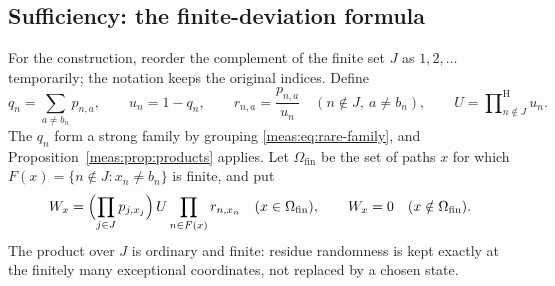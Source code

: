 \documentclass[11pt]{article}
\numberwithin{equation}{section}
\theoremstyle{definition}
\theoremstyle{remark}
\newcommand{\hprod}{\mathop{\prod}\nolimits^{\mathrm H}}
\begin{document}
\subsection{Sufficiency: the finite-deviation formula}
For the construction, reorder the complement of the finite set $J$ as
$1,2,\ldots$ temporarily; the notation keeps the original indices. Define
\[
 q_n=\sum_{a\ne b_n}p_{n,a},\qquad u_n=1-q_n,\qquad
 r_{n,a}=\frac{p_{n,a}}{u_n}\quad(n\notin J,\ a\ne b_n),\qquad
 U=\hprod_{n\notin J}u_n.
\]
The $q_n$ form a strong family by grouping \eqref{meas:eq:rare-family}, and
Proposition~\ref{meas:prop:products} applies. Let $\Omega_{\mathrm{fin}}$ be the
set of paths $x$ for which $F(x)=\{n\notin J:x_n\ne b_n\}$ is finite, and put
\begin{equation}\label{meas:eq:product-weights}
 W_x=\Bigl(\prod_{j\in J}p_{j,x_j}\Bigr)\,U\prod_{n\in F(x)}r_{n,x_n}
 \quad(x\in\Omega_{\mathrm{fin}}),\qquad
 W_x=0\quad(x\notin\Omega_{\mathrm{fin}}).
\end{equation}
The product over $J$ is ordinary and finite: residue randomness is kept
exactly at the finitely many exceptional coordinates, not replaced by a chosen
state.
\end{document}
